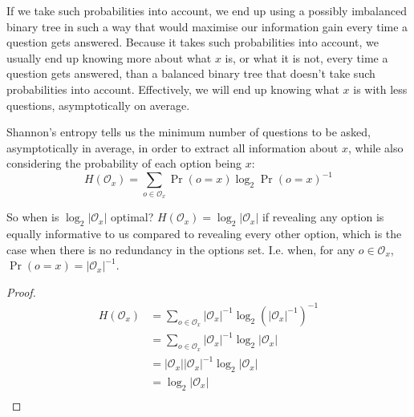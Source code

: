 \documentclass[twocolumn]{article}
\begin{document}
If we take such probabilities into account, we end up using a possibly
imbalanced binary tree in such a way that would maximise our information
gain every time a question gets answered.  Because it takes such
probabilities into account, we usually end up knowing more about what $x$
is, or what it is not, every time a question gets answered, than a balanced
binary tree that doesn't take such probabilities into account.
Effectively, we will end up knowing what $x$ is with less questions,
asymptotically on average.

Shannon's entropy tells us the minimum number of questions to be asked,
asymptotically in average, in order to extract all information about $x$,
while also considering the probability of each option being $x$:
\begin{equation}
    H(\mathcal{O}_x) = \sum_{o \in \mathcal{O}_x}
        \Pr(o=x) \log_2 \Pr(o=x)^{-1}
\end{equation}

So when is $\log_2 |\mathcal{O}_x|$ optimal?  $H(\mathcal{O}_x) = \log_2
|\mathcal{O}_x|$ if revealing any option is equally informative to us
compared to revealing every other option, which is the case when there is
no redundancy in the options set.  I.e. when, for any $o \in
\mathcal{O}_x$, $\Pr(o=x) = |\mathcal{O}_x|^{-1}$.
\begin{proof}
\begin{equation}
\begin{split}
    H(\mathcal{O}_x)
    &= \sum_{o \in \mathcal{O}_x} |\mathcal{O}_x|^{-1} \log_2
        (|\mathcal{O}_x|^{-1})^{-1} \\
    &= \sum_{o \in \mathcal{O}_x} |\mathcal{O}_x|^{-1} \log_2
        |\mathcal{O}_x| \\
    &= |\mathcal{O}_x| |\mathcal{O}_x|^{-1} \log_2 |\mathcal{O}_x| \\
    &= \log_2 |\mathcal{O}_x| \\
\end{split}
\end{equation}
\end{proof}
\end{document}

